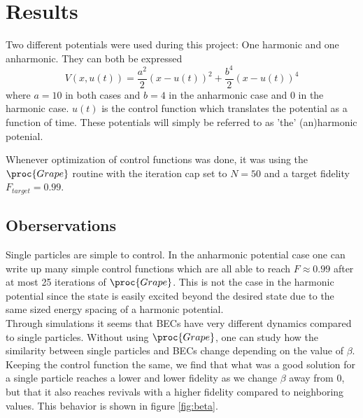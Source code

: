 \documentclass[aps,pra,reprint,superscriptaddress]{revtex4-1}
\begin{document}
\section{\label{sec:results}Results}


Two different potentials were used during this project: One harmonic and one anharmonic. They can both be expressed
\begin{equation}
	V(x, u(t)) = \frac{a^2}{2}(x-u(t))^2 + \frac{b^4}{2}(x-u(t))^4
	\label{eq:potential}
\end{equation}
where $a = 10$ in both cases and $b=4$ in the anharmonic case and $0$ in the harmonic case. $u(t)$ is the control function which translates the potential as a function of time. These potentials will simply be referred to as 'the' (an)harmonic potenial.

Whenever optimization of control functions was done, it was using the $\proc{Grape}$ routine with the iteration cap set to $N=50$ and a target fidelity $F_{target} = 0.99$. 


\subsection{\label{subsec:obs}Oberservations}
Single particles are simple to control. In the anharmonic potential case one can write up many simple control functions which are all able to reach $F\approx0.99$ after at most 25 iterations of $\proc{Grape}$. This is not the case in the harmonic potential since the state is easily excited beyond the desired state due to the same sized energy spacing of a harmonic potential. \\

Through simulations it seems that BECs have very different dynamics compared to single particles. Without using $\proc{Grape}$, one can study how the similarity between single particles and BECs change depending on the value of $\beta$. Keeping the control function the same, we find that what was a good solution for a single particle reaches a lower and lower fidelity as we change $\beta$ away from 0, but that it also reaches revivals with a higher fidelity compared to neighboring values. This behavior is shown in figure \ref{fig:beta}.\\
\end{document}
